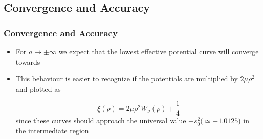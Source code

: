 \documentclass[hideothersubsections]{beamer}
\begin{document}
\subsection{Convergence and Accuracy}
\begin{frame}[label=Results]
\frametitle{Convergence and Accuracy}
\begin{itemize}
	\item<1-> For $a \rightarrow \pm \infty$ we expect that the lowest effective potential curve will converge towards
	\hyperlink{W}{}
	\item This behaviour is easier to recognize if the potentials are multiplied by $2 \mu \rho^2$ and plotted as 
	
	\begin{equation}\label{eq:lambda}
	\xi(\rho) = 2 \mu \rho^2 W_{\nu}(\rho) + \frac{1}{4}
	\end{equation}
	since these curves should approach the universal value $-s_0^2 (\simeq -1.0125$) in the intermediate region
\end{itemize}
\vfill
\hyperlink{finite}{}
\end{frame}
\end{document}
